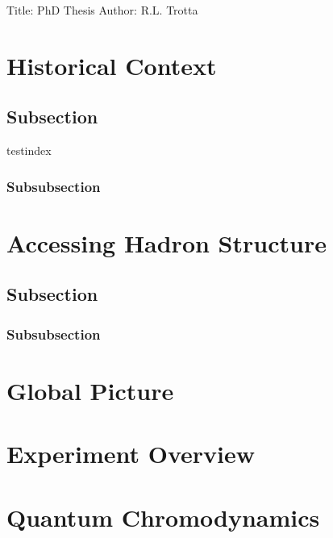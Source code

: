 \documentclass[
]{report}
\author{}
\date{}
\begin{document}
Title: PhD Thesis Author: R.L. Trotta

\label{Chapter-1}

\hypertarget{Section-1.1}{%
\section{Historical Context}\label{Section-1.1}}

\hypertarget{subsection}{%
\subsection{Subsection}\label{subsection}}

testindex  \cite{Zongkerchicken2005}

\hypertarget{subsubsection}{%
\subsubsection{Subsubsection}\label{subsubsection}}

\hypertarget{Section-1.2}{%
\section{Accessing Hadron Structure}\label{Section-1.2}}

\hypertarget{subsection-1}{%
\subsection{Subsection}\label{subsection-1}}

\hypertarget{subsubsection-1}{%
\subsubsection{Subsubsection}\label{subsubsection-1}}

\hypertarget{Section-1.3}{%
\section{Global Picture}\label{Section-1.3}}

\hypertarget{Section-1.4}{%
\section{Experiment Overview}\label{Section-1.4}}

\label{Chapter-2}

\hypertarget{Section-2.1}{%
\section{Quantum Chromodynamics}\label{Section-2.1}}
\end{document}
